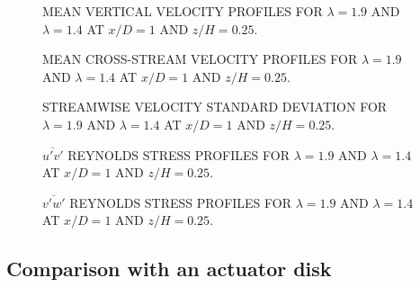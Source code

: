\begin{figure}[t]

    \caption{MEAN VERTICAL VELOCITY PROFILES FOR $\lambda = 1.9$ AND
        $\lambda=1.4$ AT $x/D=1$ AND $z/H = 0.25$.}

    \label{fig:meanw_2tsrs} 
\end{figure}

\begin{figure}[t]

    \caption{MEAN CROSS-STREAM VELOCITY PROFILES FOR $\lambda = 1.9$ AND
        $\lambda=1.4$ AT $x/D=1$ AND $z/H = 0.25$.}

    \label{fig:meanv_2tsrs} 
\end{figure}

\begin{figure}[t]

    \caption{STREAMWISE VELOCITY STANDARD DEVIATION FOR $\lambda = 1.9$ AND
        $\lambda=1.4$ AT $x/D=1$ AND $z/H = 0.25$.}

    \label{fig:stdu_2tsrs} 
\end{figure}

\begin{figure}[t]

    \caption{$\overline{u'v'}$ REYNOLDS STRESS PROFILES FOR $\lambda = 1.9$ AND
        $\lambda=1.4$ AT $x/D=1$ AND $z/H = 0.25$.}

    \label{fig:uv_2tsrs} 
\end{figure}

\begin{figure}[t]

    \caption{$\overline{v'w'}$ REYNOLDS STRESS PROFILES FOR $\lambda = 1.9$ AND
        $\lambda=1.4$ AT $x/D=1$ AND $z/H = 0.25$.}

    \label{fig:vw_2tsrs} 
\end{figure}




\subsection{Comparison with an actuator disk}

